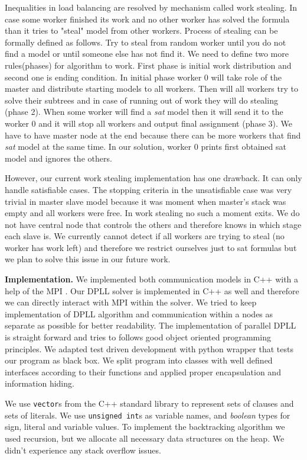\documentclass[letterpaper]{article}
\newcommand{\mypar}[1]{{\bf #1.}}
\begin{document}
Inequalities in load balancing are resolved by mechanism called work stealing. In case some worker finished its work and no other worker has solved the formula than it tries to "steal" model from other workers. Process of stealing can be formally defined as follows. Try to steal from random worker until you do not find a model or until someone else has not find it. We need to define two more rules(phases) for algorithm to work. First phase is initial work distribution and second one is ending condition. In initial phase worker 0 will take role of the master and distribute starting models to all workers. Then will all workers try to solve their subtrees and in case of running out of work they will do stealing (phase 2). When some worker will find a \textit{sat} model then it will send it to the worker 0 and it will stop all workers and output final assignment (phase 3). We have to have master node at the end because there can be more workers that find \textit{sat} model at the same time. In our solution, worker 0 prints first obtained sat model and ignores the others.

However, our current work stealing implementation has one drawback. It can only handle satisfiable cases. The stopping criteria in the unsatisfiable case was very trivial in master slave model because it was moment when master's stack was empty and all workers were free. In work stealing no such a moment exits. We do not have central node that controls the others and therefore knows in which stage each slave is. We currently cannot detect if all workers are trying to steal (no worker has work left) and therefore we restrict ourselves just to sat formulas but we plan to solve this issue in our future work. 

\mypar{Implementation}
We implemented both communication models in C++ with a help of the MPI \cite{mpi}.
Our DPLL solver is implemented in C++ as well and therefore we can directly interact with MPI within the solver. We tried to keep implementation of DPLL algorithm and communication within a nodes as separate as possible for better readability.
The implementation of parallel DPLL is straight forward and tries to follows good object oriented programming principles. We adapted test driven development with python wrapper that tests our program as black box. We split program into classes with well defined interfaces according to their functions and applied proper encapsulation and information hiding. 

We use \texttt{vector}s from the C++ standard library to represent sets of clauses and sets of literals. We use \texttt{unsigned int}s as variable names, and \textit{boolean} types for sign, literal and variable values. 
To implement the backtracking algorithm we used recursion, but we allocate all necessary data structures on the heap.
We didn't experience any stack overflow issues.
\end{document}

